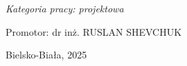 \begin{titlepage}
\begin{center}
    \textit{Kategoria pracy: projektowa}
    
    \vspace{2cm}
    
    \begin{flushright}
    Promotor: dr inż. RUSLAN SHEVCHUK \\
    
    \vspace{0.5cm}
    \end{flushright}
    
    \vfill
    
    Bielsko-Biała, 2025 \\
    
    \end{center}
    \end{titlepage}